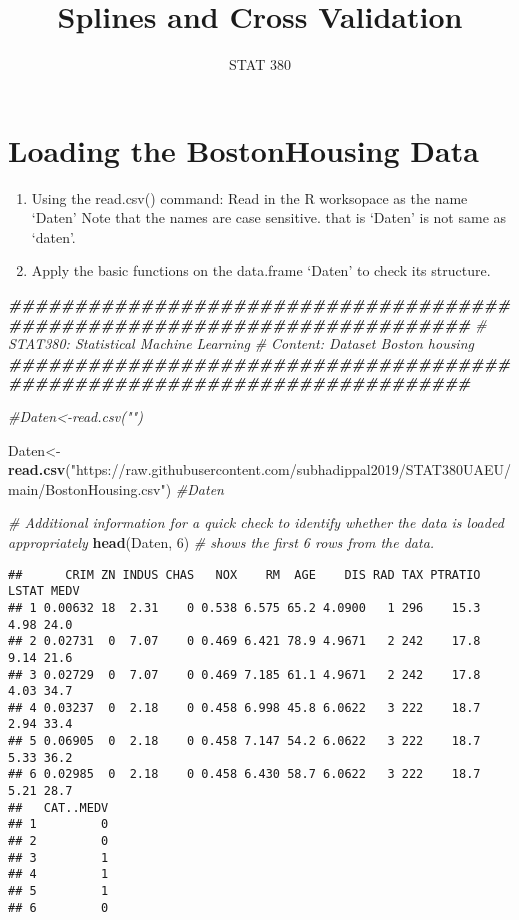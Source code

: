 \documentclass[
]{article}
\title{Splines and Cross Validation}
\author{STAT 380}
\date{}
\newenvironment{Shaded}{\begin{snugshade}}{\end{snugshade}}
\newcommand{\CommentTok}[1]{\textcolor[rgb]{0.56,0.35,0.01}{\textit{#1}}}
\newcommand{\DecValTok}[1]{\textcolor[rgb]{0.00,0.00,0.81}{#1}}
\newcommand{\DocumentationTok}[1]{\textcolor[rgb]{0.56,0.35,0.01}{\textbf{\textit{#1}}}}
\newcommand{\FunctionTok}[1]{\textcolor[rgb]{0.13,0.29,0.53}{\textbf{#1}}}
\newcommand{\NormalTok}[1]{#1}
\newcommand{\OtherTok}[1]{\textcolor[rgb]{0.56,0.35,0.01}{#1}}
\newcommand{\StringTok}[1]{\textcolor[rgb]{0.31,0.60,0.02}{#1}}
\begin{document}
\maketitle

\hypertarget{loading-the-bostonhousing-data}{%
\section{Loading the BostonHousing
Data}\label{loading-the-bostonhousing-data}}

\begin{enumerate}
\def\labelenumi{\arabic{enumi})}
\item
  Using the read.csv() command: Read in the R worksopace as the name
  `Daten' Note that the names are case sensitive. that is `Daten' is not
  same as `daten'.
\item
  Apply the basic functions on the data.frame `Daten' to check its
  structure.
\end{enumerate}

\begin{Shaded}
\begin{Highlighting}[]
\DocumentationTok{\#\#\#\#\#\#\#\#\#\#\#\#\#\#\#\#\#\#\#\#\#\#\#\#\#\#\#\#\#\#\#\#\#\#\#\#\#\#\#\#\#\#\#\#\#\#\#\#\#\#\#\#\#\#\#\#\#\#\#\#\#\#\#\#\#\#\#\#\#\#\#\#\#}
\CommentTok{\# STAT380: Statistical Machine Learning}
\CommentTok{\# Content: Dataset Boston housing    }
\DocumentationTok{\#\#\#\#\#\#\#\#\#\#\#\#\#\#\#\#\#\#\#\#\#\#\#\#\#\#\#\#\#\#\#\#\#\#\#\#\#\#\#\#\#\#\#\#\#\#\#\#\#\#\#\#\#\#\#\#\#\#\#\#\#\#\#\#\#\#\#\#\#\#\#\#\#}

\CommentTok{\#Daten\textless{}{-}read.csv("")}

\NormalTok{Daten}\OtherTok{\textless{}{-}}\FunctionTok{read.csv}\NormalTok{(}\StringTok{"https://raw.githubusercontent.com/subhadippal2019/STAT380UAEU/main/BostonHousing.csv"}\NormalTok{)}
\CommentTok{\#Daten}


\CommentTok{\# Additional information for a quick check to identify whether the data is loaded appropriately}
\FunctionTok{head}\NormalTok{(Daten, }\DecValTok{6}\NormalTok{) }\CommentTok{\# shows the first 6 rows from the data.}
\end{Highlighting}
\end{Shaded}

\begin{verbatim}
##      CRIM ZN INDUS CHAS   NOX    RM  AGE    DIS RAD TAX PTRATIO LSTAT MEDV
## 1 0.00632 18  2.31    0 0.538 6.575 65.2 4.0900   1 296    15.3  4.98 24.0
## 2 0.02731  0  7.07    0 0.469 6.421 78.9 4.9671   2 242    17.8  9.14 21.6
## 3 0.02729  0  7.07    0 0.469 7.185 61.1 4.9671   2 242    17.8  4.03 34.7
## 4 0.03237  0  2.18    0 0.458 6.998 45.8 6.0622   3 222    18.7  2.94 33.4
## 5 0.06905  0  2.18    0 0.458 7.147 54.2 6.0622   3 222    18.7  5.33 36.2
## 6 0.02985  0  2.18    0 0.458 6.430 58.7 6.0622   3 222    18.7  5.21 28.7
##   CAT..MEDV
## 1         0
## 2         0
## 3         1
## 4         1
## 5         1
## 6         0
\end{verbatim}
\end{document}
